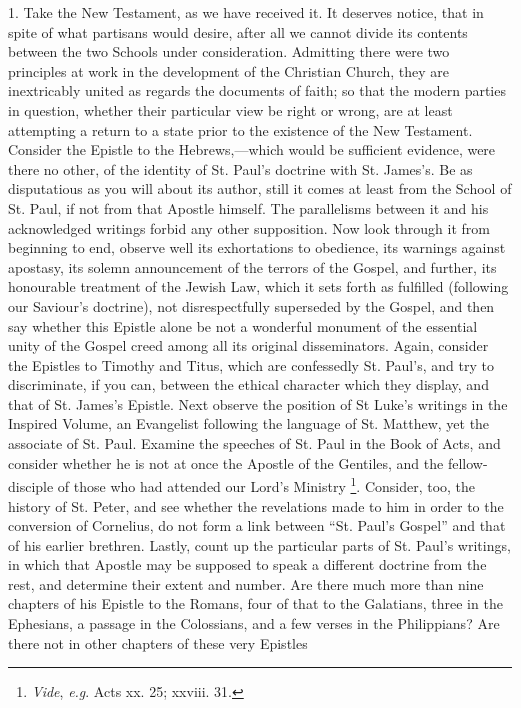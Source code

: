 1. Take the New Testament, as we have received it. It deserves
notice, that in spite of what partisans would desire, after all we
cannot divide its contents between the two Schools under consideration.
Admitting there were two principles at work in the development of the
Christian Church, they are inextricably united as regards the documents
of faith; so that the modern parties in question, whether their
particular view be right or wrong, are at least attempting a return to a
state prior to the existence of the New Testament. Consider the Epistle
to the Hebrews,—which would be sufficient evidence, were there no
other, of the identity of St. Paul's doctrine with St. James's. Be as
disputatious as you will about its author, still it comes at least from
the School of St. Paul, if not from that Apostle himself. The
parallelisms between it and his acknowledged writings forbid any other
supposition. Now look through it from beginning to end, observe well its
exhortations to obedience, its warnings against apostasy, its solemn
announcement of the terrors of the Gospel, and further, its honourable
treatment of the Jewish Law, which it sets forth as fulfilled (following
our Saviour's doctrine), not disrespectfully superseded by the Gospel,
and then say whether this Epistle alone be not a wonderful monument of
the essential unity of the Gospel creed among all its original
disseminators. Again, consider the Epistles to Timothy and Titus, which
are confessedly St. Paul's, and try to discriminate, if you can, between
the ethical character which they display, and that of St. James's
Epistle. Next observe the position of St Luke's writings in the Inspired
Volume, an Evangelist following the language of St. Matthew, yet the
associate of St. Paul. Examine the speeches of St. Paul in the Book of
Acts, and consider whether he is not at once the Apostle of the
Gentiles, and the fellow-disciple of those who had attended our Lord's
Ministry \footnote{\emph{Vide}, \emph{e.g}. Acts xx. 25; xxviii. 31.}. Consider, too,
the history of St. Peter, and see whether the revelations made to him in
order to the conversion of Cornelius, do not form a link between
``St. Paul's Gospel'' and that of his earlier brethren. Lastly,
count up the particular parts of St. Paul's writings, in which that
Apostle may be supposed to speak a different doctrine from the rest, and
determine their extent and number. Are there much more than nine
chapters of his Epistle to the Romans, four of that to the Galatians,
three in the Ephesians, a passage in the Colossians, and a few verses in
the Philippians? Are there not in other chapters of these very Epistles
